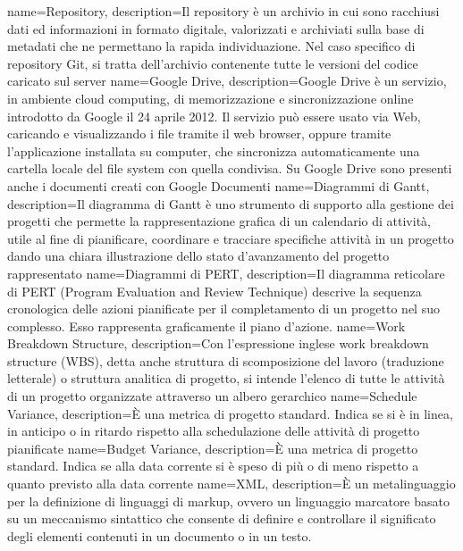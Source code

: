  {
	name=Repository,
	description={Il repository è un archivio in cui sono racchiusi dati ed informazioni in formato digitale, valorizzati e archiviati sulla base di metadati che ne permettano la rapida individuazione.
		Nel caso specifico di repository Git, si tratta dell'archivio contenente tutte le versioni del codice caricato sul server}
}
 {
	name=Google Drive,
	description={Google Drive è un servizio, in ambiente cloud computing, di memorizzazione e sincronizzazione online introdotto da Google il 24 aprile 2012. 
		Il servizio può essere usato via Web, caricando e visualizzando i file tramite il web browser, oppure tramite l'applicazione installata su computer, 
		che sincronizza automaticamente una cartella locale del file system con quella condivisa. Su Google Drive sono presenti anche i documenti creati con Google Documenti}
}
 {
	name=Diagrammi di Gantt,
	description={Il diagramma di Gantt è uno strumento di supporto alla gestione dei progetti che permette la rappresentazione grafica di un calendario di attività, 
		utile al fine di pianificare, coordinare e tracciare specifiche attività in un progetto dando una chiara illustrazione dello stato d'avanzamento del progetto rappresentato}
}
 {
	name=Diagrammi di PERT,
	description={Il diagramma reticolare di PERT (Program Evaluation and Review Technique) descrive la sequenza cronologica delle azioni pianificate per il completamento di un progetto nel suo complesso.
		Esso rappresenta graficamente il piano d'azione.}
}
 {
	name=Work Breakdown Structure,
	description={Con l'espressione inglese work breakdown structure (WBS), detta anche struttura di scomposizione del lavoro (traduzione letterale) o struttura analitica di progetto, 
		si intende l'elenco di tutte le attività di un progetto organizzate attraverso un albero gerarchico}
}
 {
	name=Schedule Variance,
	description={È una metrica di progetto standard. Indica se si è in linea, in anticipo o in ritardo rispetto alla schedulazione delle attività di progetto pianificate}
}
 {
	name=Budget Variance,
	description={È una metrica di progetto standard. Indica se alla data corrente si è speso di più o di meno rispetto a quanto previsto alla data corrente}
}
 {
	name=XML,
	description={È un metalinguaggio per la definizione di linguaggi di markup, ovvero un linguaggio marcatore basato su un meccanismo sintattico che consente di definire e controllare il significato degli elementi contenuti in un documento o in un testo.}
}
